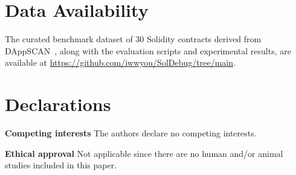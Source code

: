 \documentclass[pdflatex,sn-basic]{sn-jnl}%
\theoremstyle{thmstyleone}%
\theoremstyle{thmstyletwo}%
\theoremstyle{thmstylethree}%
\begin{document}
\section*{Data Availability}
The curated benchmark dataset of 30 Solidity contracts derived from DAppSCAN~\citep{dappscan}, along with the evaluation scripts and experimental results, are available at \url{https://github.com/iwwyou/SolDebug/tree/main}.

\section*{Declarations}

\noindent\textbf{Competing interests} The authors declare no competing interests.

\noindent\textbf{Ethical approval} Not applicable since there are no human and/or animal studies included in this paper.
\end{document}
